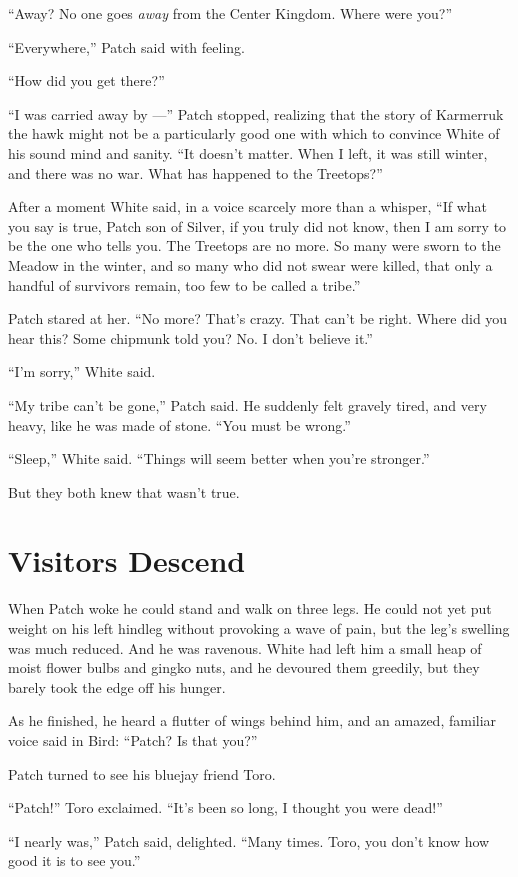 \documentclass[ebook,oneside,openany,17pt]{memoir}
\newenvironment{tolerant}[1]{%
  \par\tolerance=#1\relax
}{%
  \par
}
\renewcommand{\thechapter}{\Roman{chapter}}
\newcounter{sections}
\newcommand{\sections}[1]{%
  \section*{#1}
  \addtocounter{sections}{1}%
  \pdfbookmark[1]{#1}{section.\thechapter.\thesections}}
\begin{document}
“Away? No one goes \emph{away} from the Center Kingdom. Where were
you?”

“Everywhere,” Patch said with feeling.

“How did you get there?”

“I was carried away by —” Patch stopped, realizing that the story of
Karmerruk the hawk might not be a particularly good one with which to
convince White of his sound mind and sanity. “It doesn’t matter. When
I left, it was still winter, and there was no war. What has happened
to the Treetops?”

After a moment White said, in a voice scarcely more than a whisper,
“If what you say is true, Patch son of Silver, if you truly did not
know, then I am sorry to be the one who tells you. The Treetops are no
more. So many were sworn to the Meadow in the winter, and so many who
did not swear were killed, that only a handful of survivors remain,
too few to be called a tribe.”

Patch stared at her. “No more? That’s crazy. That can’t be
right. Where did you hear this? Some chipmunk told you? No. I don’t
believe it.”

“I’m sorry,” White said.

“My tribe can’t be gone,” Patch said. He suddenly felt gravely tired,
and very heavy, like he was made of stone. “You must be wrong.”

“Sleep,” White said. “Things will seem better when you’re stronger.”

But they both knew that wasn’t true.


\sections{Visitors Descend}

When Patch woke he could stand and walk on three legs. He could not
yet put weight on his left hindleg without provoking a wave of pain,
but the leg’s swelling was much reduced. And he was ravenous. White
had left him a small heap of moist flower bulbs and gingko nuts, and
he devoured them greedily, but they barely took the edge off his
hunger.

As he finished, he heard a flutter of wings behind him, and an amazed,
familiar voice said in Bird: “Patch? Is that you?”

Patch turned to see his bluejay friend Toro.

\begin{tolerant}{5000}
“Patch!” Toro exclaimed. “It’s been so long, I thought you were dead!”
\end{tolerant}

“I nearly was,” Patch said, delighted. “Many times. Toro, you don’t
know how good it is to see you.”
\end{document}
